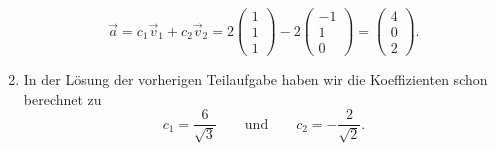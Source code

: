 \begin{losung}
\begin{enumerate}[label=(\alph*)]
\begin{equation*}
			\vec a
			=c_1\vec v_1+c_2\vec v_2
			=2\begin{pmatrix}
				1 \\ 1 \\ 1
			\end{pmatrix}
			-2\begin{pmatrix}
				-1 \\ 1 \\ 0
			\end{pmatrix}
			=\begin{pmatrix}
				4 \\ 0 \\ 2
			\end{pmatrix}.
		\end{equation*}
		\item In der Lösung der vorherigen Teilaufgabe haben wir die Koeffizienten schon berechnet zu
		\begin{equation*}
			c_1=\frac{6}{\sqrt{3}}
			\quad\quad\text{und}\quad\quad
			c_2=-\frac{2}{\sqrt{2}}.
		\end{equation*}
	\end{enumerate}
\end{losung}

